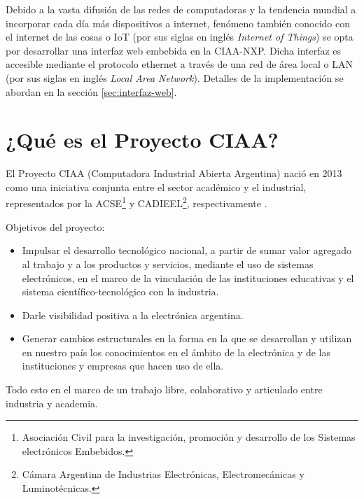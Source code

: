 Debido a la vasta difusión de las redes de computadoras y la tendencia mundial a incorporar cada día más dispositivos a internet, fenómeno también conocido con el internet de las cosas o IoT (por sus siglas en inglés \textit{Internet of Things}) se opta por desarrollar una interfaz web embebida en la CIAA-NXP.  Dicha interfaz es accesible mediante el protocolo ethernet a través de una red de área local o LAN (por sus siglas en inglés \textit{Local Area Network}). Detalles de la implementación se abordan en la sección \ref{sec:interfaz-web}.

\clearpage
\section{¿Qué es el Proyecto CIAA?}
\label{sec:proyecto-ciaa}

El Proyecto CIAA (Computadora Industrial Abierta Argentina) nació en 2013 como una iniciativa conjunta entre el sector académico y el industrial, representados por la ACSE\footnote{Asociación Civil para la investigación, promoción y desarrollo de los Sistemas electrónicos Embebidos.} y CADIEEL\footnote{Cámara Argentina de Industrias Electrónicas, Electromecánicas y Luminotécnicas.}, respectivamente \citep{CIAA}.


Objetivos del proyecto:

\begin{itemize}
	\item Impulsar el desarrollo tecnológico nacional, a partir de sumar valor agregado al trabajo y a los productos y servicios, mediante el uso de sistemas electrónicos, en el marco de la vinculación de las instituciones educativas y el sistema científico-tecnológico con la industria.
	\item Darle visibilidad positiva a la electrónica argentina.
	\item Generar cambios estructurales en la forma en la que se desarrollan y utilizan en nuestro país los conocimientos en el ámbito de la electrónica y de las instituciones y empresas que hacen uso de ella.
\end{itemize}

Todo esto en el marco de un trabajo libre, colaborativo y articulado entre industria y academia. 

